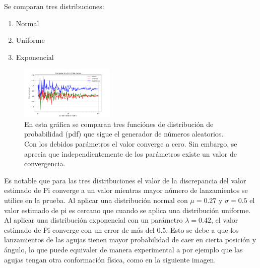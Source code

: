 \documentclass{rbf}
\begin{document}
Se comparan tres distribuciones:
\begin{enumerate}
    \item Normal
    \item Uniforme
    \item Exponencial
\end{enumerate}

\begin{figure}[tbp!]
 \centering
  \includegraphics[width=0.4\textwidth]{figures/grafica.png}
	\caption{En esta gráfica se comparan tres funciónes de distribución de probabilidad (pdf) que sigue el generador de números aleatorios. Con los debidos parámetros el valor converge a cero. Sin embargo, se aprecia que independientemente de los parámetros existe un valor de convergencia. }
 \label{buff5}
\end{figure}
Es notable que para las tres distribuciones el valor de la discrepancia del valor estimado de Pi converge a un valor mientras mayor número de lanzamientos se utilice en la prueba. Al aplicar una distribución normal con $\mu=0.27$ y  $\sigma=0.5$ el valor estimado de pi es cercano que cuando se aplica una distribución uniforme. Al aplicar una distribución exponencial con un parámetro $\lambda=0.42$, el valor estimado de Pi converge con un error de más del $0.5$. Esto se debe a que los lanzamientos de las agujas tienen mayor probabilidad de caer en cierta posición y ángulo, lo que puede equivaler de manera experimental a por ejemplo que las agujas tengan otra conformación física, como en la siguiente imagen.
\end{document}
